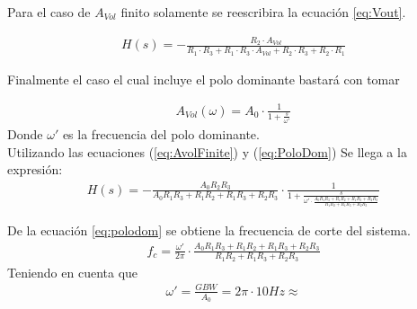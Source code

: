 Para el caso de $A_{Vol}$ finito solamente se reescribira la ecuación \ref{eq:Vout}.

\begin{align}
H(s)= -\frac{R_2\cdot A_{Vol}}{R_1\cdot R_3+R_1\cdot R_3 \cdot A_{Vol} +R_2\cdot R_3+R_2\cdot R_1}
\label{eq:AvolFinite}
\end{align}

Finalmente el caso el cual incluye el polo dominante bastará con tomar 

\begin{align}A_{Vol}(\omega)=A_0 \cdot \frac{1}{1+\frac{s}{\omega'}}
\label{eq:PoloDom}
\end{align}
Donde $\omega'$ es la frecuencia del polo dominante.\\
Utilizando las ecuaciones (\ref{eq:AvolFinite}) y (\ref{eq:PoloDom})
Se llega a la expresión:
\begin{align}
\label{eq:polodom}
H(s)=-\frac{A_0R_2R_3}{A_0R_1R_3+R_1R_2+R_1R_3+R_2R_3} \cdot\frac{1}{1+\frac{s}{\omega' \cdot \frac{A_0R_1R_3+R_1R_2+R_1R_3+R_2R_3}{R_1R_2+R_1R_3+R_2R_3}}}
\end{align}

De la ecuación \ref{eq:polodom} se obtiene la frecuencia de corte del sistema.
\begin{align}
f_c=\frac{\omega'}{2\pi} \cdot \frac{A_0R_1R_3+R_1R_2+R_1R_3+R_2R_3}{R_1R_2+R_1R_3+R_2R_3}
\end{align}
Teniendo en cuenta que
\begin{align}
\omega'=\frac{GBW}{A_0} = 2 \pi\cdot 10Hz \approx 
\end{align}

